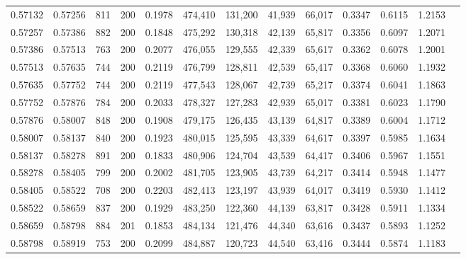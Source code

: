 \begin{tabular}{rrrrrrrrrrrrr}
0.57132 & 0.57256 &    811 & 200 &                                     0.1978 & 474,410 & 131,200 &  41,939 &  66,017 & 0.3347 & 0.6115 & 1.2153 \\
0.57257 & 0.57386 &    882 & 200 &                                     0.1848 & 475,292 & 130,318 &  42,139 &  65,817 & 0.3356 & 0.6097 & 1.2071 \\
0.57386 & 0.57513 &    763 & 200 &                                     0.2077 & 476,055 & 129,555 &  42,339 &  65,617 & 0.3362 & 0.6078 & 1.2001 \\
0.57513 & 0.57635 &    744 & 200 &                                     0.2119 & 476,799 & 128,811 &  42,539 &  65,417 & 0.3368 & 0.6060 & 1.1932 \\
0.57635 & 0.57752 &    744 & 200 &                                     0.2119 & 477,543 & 128,067 &  42,739 &  65,217 & 0.3374 & 0.6041 & 1.1863 \\
0.57752 & 0.57876 &    784 & 200 &                                     0.2033 & 478,327 & 127,283 &  42,939 &  65,017 & 0.3381 & 0.6023 & 1.1790 \\
0.57876 & 0.58007 &    848 & 200 &                                     0.1908 & 479,175 & 126,435 &  43,139 &  64,817 & 0.3389 & 0.6004 & 1.1712 \\
0.58007 & 0.58137 &    840 & 200 &                                     0.1923 & 480,015 & 125,595 &  43,339 &  64,617 & 0.3397 & 0.5985 & 1.1634 \\
0.58137 & 0.58278 &    891 & 200 &                                     0.1833 & 480,906 & 124,704 &  43,539 &  64,417 & 0.3406 & 0.5967 & 1.1551 \\
0.58278 & 0.58405 &    799 & 200 &                                     0.2002 & 481,705 & 123,905 &  43,739 &  64,217 & 0.3414 & 0.5948 & 1.1477 \\
0.58405 & 0.58522 &    708 & 200 &                                     0.2203 & 482,413 & 123,197 &  43,939 &  64,017 & 0.3419 & 0.5930 & 1.1412 \\
0.58522 & 0.58659 &    837 & 200 &                                     0.1929 & 483,250 & 122,360 &  44,139 &  63,817 & 0.3428 & 0.5911 & 1.1334 \\
0.58659 & 0.58798 &    884 & 201 &                                     0.1853 & 484,134 & 121,476 &  44,340 &  63,616 & 0.3437 & 0.5893 & 1.1252 \\
0.58798 & 0.58919 &    753 & 200 &                                     0.2099 & 484,887 & 120,723 &  44,540 &  63,416 & 0.3444 & 0.5874 & 1.1183 \\

\end{tabular}
